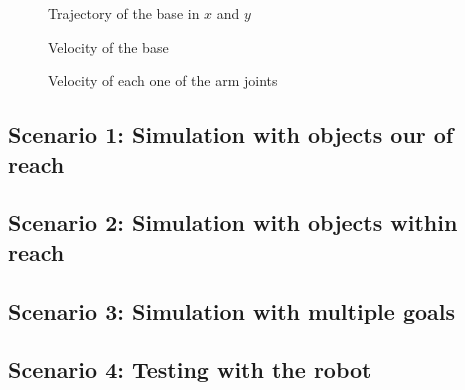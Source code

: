 \begin{figure}[H]
	\centering
	
	\vspace{-20pt}
	\caption[Base Trajectory]{Trajectory of the base in $x$ and $y$}
	\vspace{-15pt} \label{fig:base_pos}
\end{figure}
\begin{figure}[H]
	\centering
	\vspace{-20pt}
	\caption[Base Velocity]{Velocity of the base}
	\vspace{-15pt} \label{fig:base_vel}
\end{figure}
\begin{figure}[H]
	\centering
	\vspace{-20pt}
	\caption[Arm Velocity]{Velocity of each one of the arm joints} \vspace{-15pt} \label{fig:arm_vel}
\end{figure}



\subsection{Scenario 1: Simulation with objects our of reach}





\subsection{Scenario 2: Simulation with objects within reach}


\subsection{Scenario 3: Simulation with multiple goals}


\subsection{Scenario 4: Testing with the robot}

